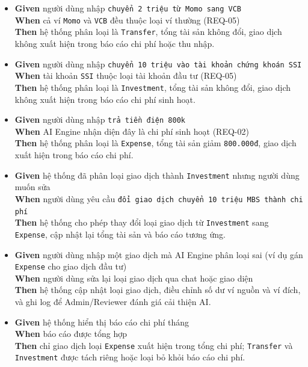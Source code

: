 \begin{itemize}
\item \textbf{Given} người dùng nhập \texttt{chuyển 2 triệu từ Momo sang VCB}  \\ \hspace*{1.5em}  \textbf{When} cả ví \texttt{Momo} và \texttt{VCB} đều thuộc loại ví thường (REQ-05)  \\ \hspace*{1.5em}  \textbf{Then} hệ thống phân loại là \texttt{Transfer}, tổng tài sản không đổi, giao dịch không xuất hiện trong báo cáo chi phí hoặc thu nhập.
\item \textbf{Given} người dùng nhập \texttt{chuyển 10 triệu vào tài khoản chứng khoán SSI}  \\ \hspace*{1.5em}  \textbf{When} tài khoản \texttt{SSI} thuộc loại tài khoản đầu tư (REQ-05)  \\ \hspace*{1.5em}  \textbf{Then} hệ thống phân loại là \texttt{Investment}, tổng tài sản không đổi, giao dịch không xuất hiện trong báo cáo chi phí sinh hoạt.
\item \textbf{Given} người dùng nhập \texttt{trả tiền điện 800k}  \\ \hspace*{1.5em}  \textbf{When} AI Engine nhận diện đây là chi phí sinh hoạt (REQ-02)  \\ \hspace*{1.5em}  \textbf{Then} hệ thống phân loại là \texttt{Expense}, tổng tài sản giảm \texttt{800.000đ}, giao dịch xuất hiện trong báo cáo chi phí.
\item \textbf{Given} hệ thống đã phân loại giao dịch thành \texttt{Investment} nhưng người dùng muốn sửa  \\ \hspace*{1.5em}  \textbf{When} người dùng yêu cầu \texttt{đổi giao dịch chuyển 10 triệu MBS thành chi phí}  \\ \hspace*{1.5em}  \textbf{Then} hệ thống cho phép thay đổi loại giao dịch từ \texttt{Investment} sang \texttt{Expense}, cập nhật lại tổng tài sản và báo cáo tương ứng.
\item \textbf{Given} người dùng nhập một giao dịch mà AI Engine phân loại sai (ví dụ gán \texttt{Expense} cho giao dịch đầu tư)  \\ \hspace*{1.5em}  \textbf{When} người dùng sửa lại loại giao dịch qua chat hoặc giao diện  \\ \hspace*{1.5em}  \textbf{Then} hệ thống cập nhật loại giao dịch, điều chỉnh số dư ví nguồn và ví đích, và ghi log để Admin/Reviewer đánh giá cải thiện AI.
\item \textbf{Given} hệ thống hiển thị báo cáo chi phí tháng  \\ \hspace*{1.5em}  \textbf{When} báo cáo được tổng hợp  \\ \hspace*{1.5em}  \textbf{Then} chỉ giao dịch loại \texttt{Expense} xuất hiện trong tổng chi phí; \texttt{Transfer} và \texttt{Investment} được tách riêng hoặc loại bỏ khỏi báo cáo chi phí.
\end{itemize}
